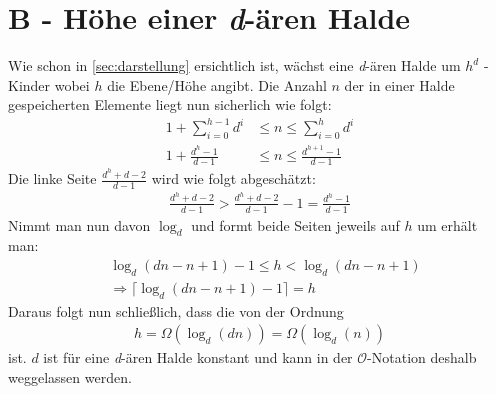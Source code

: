 \documentclass[ngerman]{scrartcl}
\begin{document}
\section{B - Höhe einer \emph{d}-ären Halde}
\label{sec:hoehe}
Wie schon in \autoref{sec:darstellung} ersichtlich ist, wächst eine \emph{d}-ären Halde um $h^d$ - Kinder wobei $h$ die Ebene/Höhe angibt. Die Anzahl $n$ der in einer Halde gespeicherten Elemente liegt nun sicherlich wie folgt:
\begin{align*}
    1+\sum_{i = 0}^{h-1} d^i &\leq n \leq \sum_{i = 0}^{h} d^i\\
    1+\frac{d^h-1}{d-1} &\leq n \leq \frac{d^{h+1}-1}{d-1}
\end{align*}
Die linke Seite $\frac{d^h+d-2}{d-1}$ wird wie folgt abgeschätzt:
\begin{align*}
    \frac{d^h+d-2}{d-1}>\frac{d^h+d-2}{d-1}-1 = \frac{d^h-1}{d-1}
\end{align*}
Nimmt man nun davon $\log_d$ und formt beide Seiten jeweils auf $h$ um erhält man:
\begin{align*}
    &\log_d(dn-n+1)-1 \leq h < \log_d(dn-n+1)\\
    &\Longrightarrow \lceil \log_d(dn-n+1)-1 \rceil = h
\end{align*}
Daraus folgt nun schließlich, dass die von der Ordnung
\begin{align*}
    h = \Omega(\log_d(dn)) = \Omega(\log_d(n))
\end{align*}
ist. $d$ ist für eine \emph{d}-ären Halde konstant und kann in der $\mathcal{O}$-Notation deshalb weggelassen werden.
\end{document}
